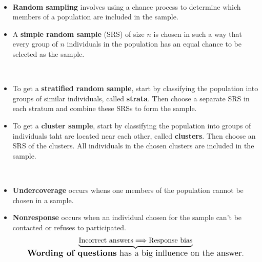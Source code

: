 \documentclass[Main.tex]{subfiles}
\begin{document}
	\begin{example} \hfill \\
		\begin{itemize}
			\item \textbf{Random sampling} involves using a chance process to determine which members of a population are included in the sample.\\
			\item A \textbf{simple random sample} (SRS) of size $n$ is chosen in such a way that every group of $n$ individuals in the population has an equal chance to be selected as the sample.
		\end{itemize}
	\end{example} \newpage
	
	\begin{example} \hfill \\
		\begin{itemize}				
			\item To get a \textbf{stratified random sample}, start by classifying the population into groups of similar individuals, called \textbf{strata}. Then choose a separate SRS in each stratum and combine these SRSs to form the sample.\\
			\item To get a \textbf{cluster sample}, start by classifying the population into groups of individuals taht are located near each other, called \textbf{clusters}. Then choose an SRS of the clusters. All individuals in the chosen clusters are included in the sample.
		\end{itemize}
	\end{example}	
	
	\begin{example} \hfill \\
		\begin{itemize}	
			\item \textbf{Undercoverage} occurs whens one members of the population cannot be chosen in a sample.\\
			\item \textbf{Nonresponse} occurs when an individual chosen for the sample can't be contacted or refuses to participated.\hfill 
			\begin{subequations}
				\begin{align}
				\underbrace{\text{Incorrect answers}\Longrightarrow\text{Response bias}}_{\text{\large \textbf{Wording of questions} has a big influence on the answer.}} \notag
				\end{align}
			\end{subequations}\hfill			
		\end{itemize}
	\end{example}			
	
\end{document}
